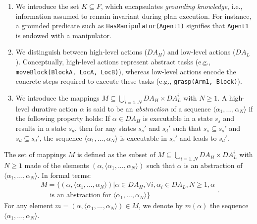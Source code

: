 \begin{enumerate}
    \item We introduce the set $K\subseteq F$, which encapsulates \textit{grounding knowledge}, i.e., information assumed to remain invariant during plan execution. For instance, a grounded predicate such as \texttt{HasManipulator(Agent1)} signifies that \texttt{Agent1} is endowed with a manipulator.
    
    \item We distinguish between high-level actions ($DA_H$) and low-level actions ($DA_L$). Conceptually, high-level actions represent abstract tasks (e.g., \texttt{moveBlock(BlockA, LocA, LocB)}), whereas low-level actions encode the concrete steps required to execute these tasks (e.g., \texttt{grasp(Arm1, Block)}).
    
    \item We introduce the mappings $\displaystyle M \subseteq \bigcup_{i=1..N} DA_H \times DA_L^i$ with $N \ge 1$. 
    A high-level durative action $\alpha$ is said to be an \textit{abstraction} of a sequence $\langle \alpha_1, ..., \alpha_N \rangle$ if the following property holds: If $\alpha \in DA_H$ is executable in a state $s_s$ and results in a state $s_d$, then for any states $s_s'$ and $s_d'$ such that $s_s \subseteq s_s'$ and $s_d \subseteq s_d'$, the sequence $\langle \alpha_1, ..., \alpha_N \rangle$ is executable in $s_s'$ and leads to $s_d'$.
\end{enumerate}

\sloppypar
The set of mappings $M$ is defined as the subset of $M \subseteq \bigcup_{i=1..N} DA_H \times DA_L^i$ with $N \ge 1$ made of the elements $\left(\alpha, \langle \alpha_1, ..., \alpha_N \rangle \right)$ such that $\alpha$ is an abstraction of $\langle \alpha_1, ..., \alpha_N \rangle$. In formal terms:
\[ 
\begin{array}{r}
M = \{ (\alpha, \langle \alpha_1, ..., \alpha_N \rangle) | \alpha \in DA_H, \forall i, \alpha_i \in DA_L, N \ge 1, \alpha \\
\quad \text{ is an abstraction for } \langle \alpha_1, ..., \alpha_N \rangle\}
\end{array}.
\]
For any element $m = (\alpha, \langle \alpha_1, ..., \alpha_N \rangle) \in M$, we denote by $m(\alpha)$ the sequence $\langle \alpha_1, ..., \alpha_N \rangle$.


